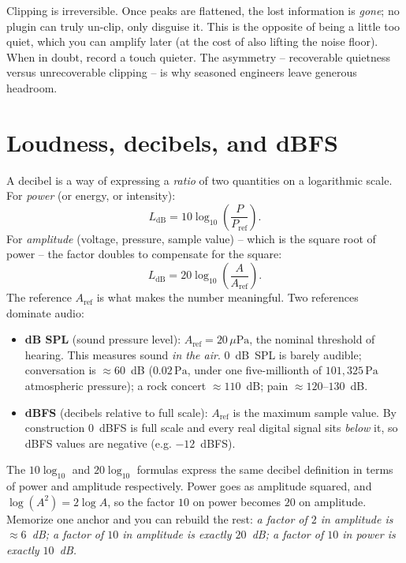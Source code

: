 \begin{trapbox}
Clipping is irreversible. Once peaks are flattened, the lost information is \emph{gone}; no plugin
can truly un-clip, only disguise it. This is the opposite of being a little too quiet, which you
can amplify later (at the cost of also lifting the noise floor). When in doubt, record
a touch quieter. The asymmetry -- recoverable quietness versus unrecoverable clipping -- is why
seasoned engineers leave generous headroom.
\end{trapbox}

\section{Loudness, decibels, and dBFS}
\label{ch26:loudness}

A decibel is a way of
expressing a \emph{ratio} of two quantities on a logarithmic scale. For \emph{power} (or energy,
or intensity):
\[
  L_{\text{dB}} = 10\log_{10}\!\left(\frac{P}{P_{\text{ref}}}\right).
\]
For \emph{amplitude} (voltage, pressure, sample value) -- which is the square root of power -- the
factor doubles to compensate for the square:
\[
  L_{\text{dB}} = 20\log_{10}\!\left(\frac{A}{A_{\text{ref}}}\right).
\]
The reference $A_{\text{ref}}$ is what makes the number meaningful. Two references dominate audio:

\begin{itemize}
\item \textbf{dB SPL} (sound pressure level): $A_{\text{ref}} = 20\,\mu\text{Pa}$, the nominal
  threshold of hearing. This measures sound \emph{in the air}. $0$~dB~SPL is barely audible;
  conversation is $\approx 60$~dB ($0.02\,\text{Pa}$, under one five-millionth of $101{,}325\,\text{Pa}$ atmospheric pressure); a rock concert $\approx 110$~dB; pain $\approx 120$--$130$~dB.
\item \textbf{dBFS} (decibels relative to full scale): $A_{\text{ref}}$ is the maximum sample
  value. By construction $0$~dBFS is full scale and every real digital signal sits \emph{below}
  it, so dBFS values are negative (e.g. $-12$~dBFS).
\end{itemize}

\begin{intuitionbox}
The $10\log_{10}$ and $20\log_{10}$ formulas express the same decibel
definition in terms of power and amplitude respectively. Power goes as amplitude squared, and
$\log(A^2) = 2\log A$, so the factor $10$ on power becomes $20$ on amplitude. Memorize one anchor
and you can rebuild the rest: \emph{a factor of $2$ in amplitude is $\approx 6$~dB; a factor of
$10$ in amplitude is exactly $20$~dB; a factor of $10$ in power is exactly $10$~dB.}
\end{intuitionbox}

